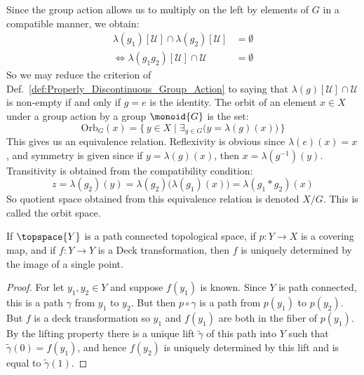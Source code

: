 \documentclass{book}                                                           %
\begin{document}
Since the group action allows us to multiply on the left by elements of $G$
in a compatible manner, we obtain:
\begin{subequations}
    \begin{align}
        \lambda(g_{1})[\mathcal{U}]\cap\lambda(g_{2})[\mathcal{U}]
            &=\emptyset\\
        \Leftrightarrow
        \lambda(g_{1}g_{2})[\mathcal{U}]\cap\mathcal{U}&=\emptyset
    \end{align}
\end{subequations}
So we may reduce the criterion of
Def.~\ref{def:Properly_Discontinuous_Group_Action}
to saying that $\lambda(g)[\mathcal{U}]\cap\mathcal{U}$ is non-empty if and
only if $g=e$ is the identity. The orbit of an element $x\in{X}$ under a
group action by a group $\monoid{G}$ is the set:
\begin{equation}
    \textrm{Orb}_{G}(x)=\{\,y\in{X}\;|\;\exists_{g\in{G}}
        \big(y=\lambda(g)(x)\big)\,\}
\end{equation}
This gives us an equivalence relation. Reflexivity is obvious since
$\lambda(e)(x)=x$, and symmetry is given since if
$y=\lambda(g)(x)$, then $x=\lambda(g^{\minus{1}})(y)$. Transitivity is
obtained from the compatibility condition:
\begin{equation}
    z=\lambda(g_{2})(y)=\lambda(g_{2})\big(\lambda(g_{1})(x)\big)
        =\lambda(g_{1}*g_{2})(x)
\end{equation}
So quotient space obtained from this equivalence relation is denoted $X/G$.
This is called the orbit space.
\begin{theorem}
    If $\topspace{Y}$ is a path connected topological space, if
    $p:Y\rightarrow{X}$ is a covering map, and if $f:Y\rightarrow{Y}$ is a
    Deck transformation, then $f$ is uniquely determined by the image of a
    single point.
\end{theorem}
\begin{proof}
    For let $y_{1},y_{2}\in{Y}$ and suppose $f(y_{1})$ is known. Since $Y$
    is path connected, this is a path $\gamma$ from $y_{1}$ to $y_{2}$. But
    then $p\circ\gamma$ is a path from $p(y_{1})$ to $p(y_{2})$. But $f$ is
    a deck transformation so $y_{1}$ and $f(y_{1})$ are both in the fiber of
    $p(y_{1})$. By the lifting property there is a unique lift
    $\tilde{\gamma}$ of this path
    into $Y$ such that $\tilde{\gamma}(0)=f(y_{1})$, and hence
    $f(y_{2})$ is uniquely determined by this lift and is equal to
    $\tilde{\gamma}(1)$.
\end{proof}
\end{document}
